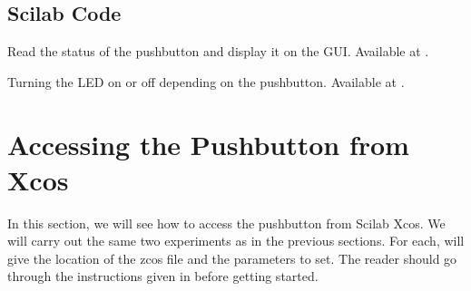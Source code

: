 \subsection{Scilab Code}
\label{sec:push-scilab-code}

\begin{scicode}
{Read the status of the pushbutton and display it on the GUI.  Available at
  .}
\label{sci:push-100}

\end{scicode}

\begin{scicode}
  {Turning the LED on or off depending on the pushbutton.  Available at
  .}
\label{sci:push-200}

\end{scicode}




\section{Accessing the Pushbutton from Xcos}
\label{sec:push-xcos}
In this section, we will see how to access the pushbutton from Scilab
Xcos.  We will carry out the same two experiments as in the previous
sections.  For each, will give the location of the zcos file and the
parameters to set.  The reader should go through the instructions
given in  before getting started.

